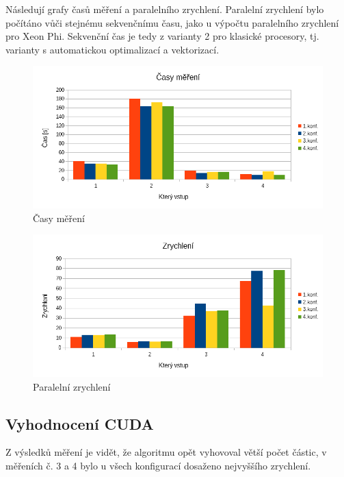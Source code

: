 \documentclass[12pt]{article}
\begin{document}
Následují grafy časů měření a paralelního zrychlení.
Paralelní zrychlení bylo počítáno vůči stejnému sekvenčnímu času, jako u výpočtu paralelního zrychlení pro Xeon Phi.
Sekvenční čas je tedy z varianty 2 pro klasické procesory, tj. varianty s automatickou optimalizací a vektorizací.
\begin{figure}[H]
  \begin{center}
      \includegraphics[width=14cm]{images/cuda/casy.png}
    \caption{Časy měření}
  \end{center}
\end{figure}

\begin{figure}[H]
  \begin{center}
      \includegraphics[width=14cm]{images/cuda/zrychleni.png}
    \caption{Paralelní zrychlení}
  \end{center}
\end{figure}

\subsection{Vyhodnocení CUDA}
Z výsledků měření je vidět, že algoritmu opět vyhovoval větší počet částic, v měřeních č. 3 a 4 bylo u všech konfigurací dosaženo nejvyššího zrychlení.
\end{document}
